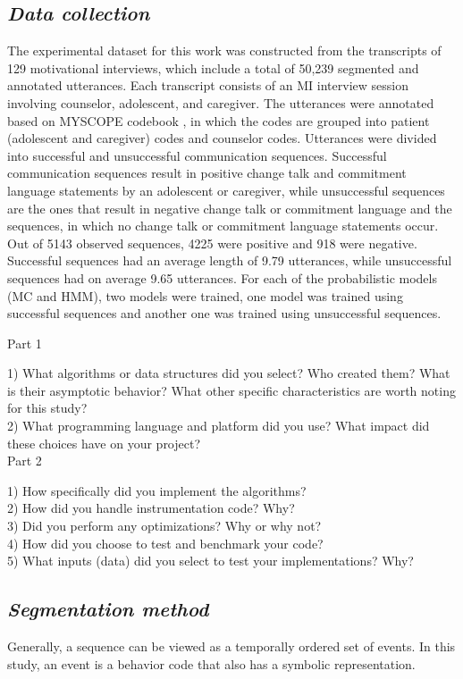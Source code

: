 \documentclass{amia}
\begin{document}
\subsection*{\textit{Data collection}}
The experimental dataset for this work was constructed from the transcripts of 129 motivational interviews, which include a total of 50,239 segmented and annotated utterances. Each transcript consists
of an MI interview session involving counselor, adolescent, and caregiver. The utterances were annotated based on MYSCOPE codebook \cite{carcone2013provider}, in which the codes are grouped into
patient (adolescent and caregiver) codes and counselor codes. Utterances were divided into successful and unsuccessful communication sequences. Successful communication sequences result in
positive change talk and commitment language statements by an adolescent or caregiver, while unsuccessful sequences are the ones that result in negative change talk or commitment language and the
sequences, in which no change talk or commitment language statements occur. Out of 5143 observed sequences, 4225 were positive and 918 were negative. Successful sequences had an average length of
9.79 utterances, while unsuccessful sequences had on average 9.65 utterances. For each of the probabilistic models (MC and HMM), two models were trained, one model was trained using successful
sequences and another one was trained using unsuccessful sequences. 

Part 1

1) What algorithms or data structures did you select? Who created them? What is their asymptotic behavior? What other specific characteristics are worth noting for this study?\\
2) What programming language and platform did you use? What impact did these choices have on your project?\\


Part 2

1) How specifically did you implement the algorithms?\\
2) How did you handle instrumentation code? Why?\\
3) Did you perform any optimizations? Why or why not?\\
4) How did you choose to test and benchmark your code?\\
5) What inputs (data) did you select to test your implementations? Why?\\

\subsection*{\textit{Segmentation method}}
Generally, a sequence can be viewed as a temporally ordered set of events. In this study, an event is a behavior code that also has a symbolic representation.
\end{document}
